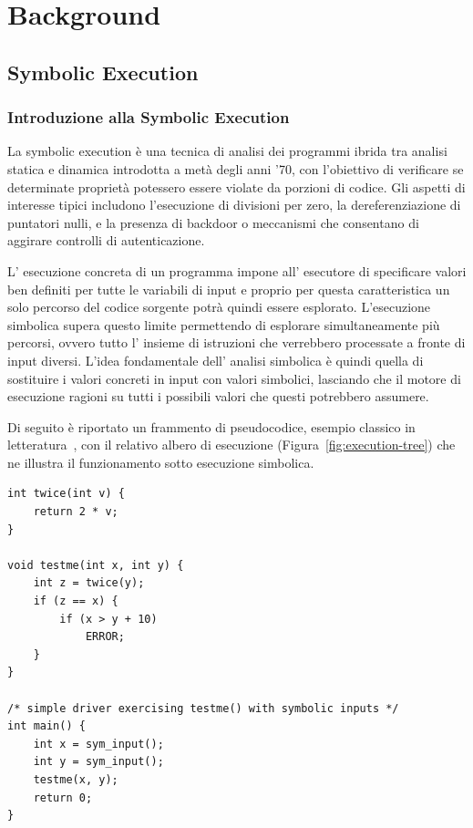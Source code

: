 \chapter{Background}
\label{chap:background}
\section{Symbolic Execution}
\label{subsec:symbolic_execution}
\subsection{Introduzione alla Symbolic Execution}
\label{subsec:intro_symbolic_execution}
La symbolic execution è una tecnica di analisi dei programmi ibrida tra analisi statica e dinamica introdotta a metà degli anni '70,
con l'obiettivo di verificare se determinate proprietà potessero essere violate da porzioni di codice. Gli
aspetti di interesse tipici includono l'esecuzione di divisioni per zero, la dereferenziazione di puntatori
nulli, e la presenza di backdoor o meccanismi che consentano di aggirare controlli di autenticazione.

L' esecuzione concreta di un programma impone all' esecutore di specificare valori ben definiti per tutte le variabili di input e proprio per questa caratteristica un solo percorso del codice sorgente potrà quindi essere esplorato. L'esecuzione simbolica supera questo limite permettendo di
esplorare simultaneamente più percorsi, ovvero tutto l' insieme di istruzioni che verrebbero processate a fronte di input diversi.
L'idea fondamentale dell' analisi simbolica è quindi quella di sostituire i valori concreti in input con valori simbolici, lasciando che il motore di esecuzione ragioni su tutti i possibili valori che questi potrebbero assumere.

Di seguito è riportato un frammento di pseudocodice, esempio classico
in letteratura~\cite{Cadar_sym_ex_survey}, con il relativo albero di
esecuzione (Figura~\ref{fig:execution-tree}) che ne illustra il
funzionamento sotto esecuzione simbolica.


\begin{listing}[H]
\begin{verbatim}
int twice(int v) {
    return 2 * v;
}

void testme(int x, int y) {
    int z = twice(y);
    if (z == x) {
        if (x > y + 10)
            ERROR;
    }
}

/* simple driver exercising testme() with symbolic inputs */
int main() {
    int x = sym_input();
    int y = sym_input();
    testme(x, y);
    return 0;
}
\end{verbatim}
\caption{Pseudocodice di esempio~\cite{Cadar_sym_ex_survey}.}
\label{lst:testme-code}
\end{listing}


